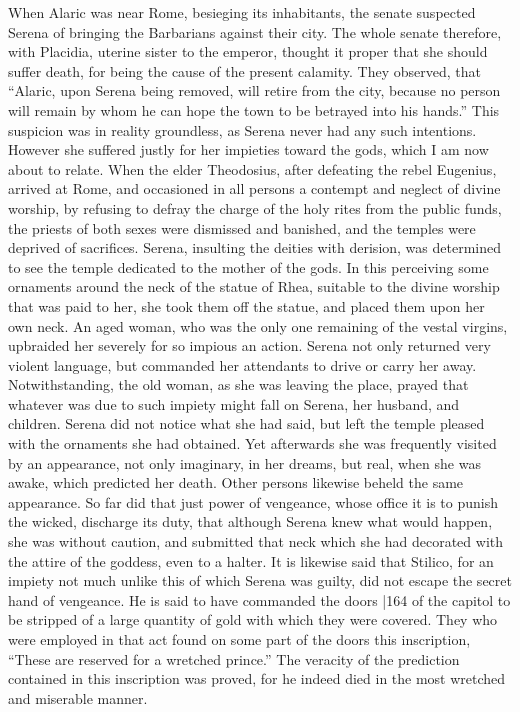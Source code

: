 When Alaric was near Rome, besieging its inhabitants, the senate suspected Serena of bringing the Barbarians against their city. The whole senate therefore, with Placidia, uterine sister to the emperor, thought it proper that she should suffer death, for being the cause of the present calamity. They observed, that ``Alaric, upon Serena being removed, will retire from the city, because no person will remain by whom he can hope the town to be betrayed into his hands.'' This suspicion was in reality groundless, as Serena never had any such intentions. However she suffered justly for her impieties toward the gods, which I am now about to relate. When the elder Theodosius, after defeating the rebel Eugenius, arrived at Rome, and occasioned in all persons a contempt and neglect of divine worship, by refusing to defray the charge of the holy rites from the public funds, the priests of both sexes were dismissed and banished, and the temples were deprived of sacrifices. Serena, insulting the deities with derision,
was determined to see the temple dedicated to the mother of the gods. In this perceiving some ornaments around the neck of the statue of Rhea, suitable to the divine worship that was paid to her, she took them off the statue, and placed them upon her own neck. An aged woman, who was the only one remaining of the vestal virgins, upbraided her severely for so impious an action. Serena not only returned very violent language, but commanded her attendants to drive or carry her away. Notwithstanding, the old woman, as she was leaving the place, prayed that whatever
was due to such impiety might fall on Serena, her husband, and children. Serena did not notice what she had said, but left the temple pleased with the ornaments she had obtained. Yet afterwards she was frequently visited by an appearance, not only imaginary, in her dreams, but real, when she was awake, which predicted her death. Other persons likewise beheld the same appearance. So far did that just power of vengeance, whose office it is to punish the wicked, discharge its duty, that although Serena knew what would happen, she was without caution, and submitted that neck which she had decorated with the attire of the goddess, even to a halter. It is likewise said that Stilico, for an impiety not much unlike this of which Serena was guilty, did not escape the secret hand of vengeance. He is said to have commanded the doors
|164 of the capitol to be stripped of a large quantity of gold with which they were covered. They who were employed in that act found on some part of the doors this inscription, ``These are reserved for a wretched prince.'' The veracity of the prediction contained in this inscription was proved, for he indeed died in the most wretched and miserable manner.


